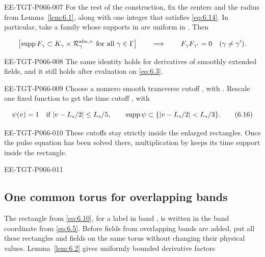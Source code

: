 \begin{EESegment}{EE-TGT-P066-007}
For the rest of the construction, fix the centers  and the radius  from Lemma~\ref{lem:6.1}, along with one integer  that satisfies \eqref{eq:6.14}. In particular, take a family  whose supports in  are uniform in . Then
\end{EESegment}
\[
 \bigl[\operatorname{supp} F_\gamma\subset K_\gamma\times\mathcal R_\gamma^{\mathrm{abs},+}
 \text{ for all }\gamma\in\Gamma\bigr]
 \qquad\Longrightarrow\qquad
 F_\gamma F_{\gamma'}=0
 \quad(\gamma\ne\gamma').
\]
\begin{EESegment}{EE-TGT-P066-008}
The same identity holds for derivatives of smoothly extended fields, and it still holds after evaluation on \eqref{eq:6.3}.
\end{EESegment}

\begin{EESegment}{EE-TGT-P066-009}
Choose a nonzero smooth transverse cutoff , with . Rescale one fixed function to get the time cutoff , with
\end{EESegment}
\begin{equation}
 \psi(v)=1\quad\text{if }|v-L_s/2|\le L_s/5,
 \qquad
 \operatorname{supp}\psi\subset\{|v-L_s/2|<L_s/3\}.
 \tag{6.16}\label{eq:6.16}
\end{equation}
\begin{EESegment}{EE-TGT-P066-010}
These cutoffs stay strictly inside the enlarged rectangles. Once the pulse equation has been solved there, multiplication by  keeps its time support inside the rectangle.
\end{EESegment}

\begin{EESegment}{EE-TGT-P066-011}
\subsection{One common torus for overlapping bands}\label{sec:6.3}

The rectangle  from \eqref{eq:6.10}, for a label in band , is written in the band coordinate  from \eqref{eq:6.5}. Before fields from overlapping bands are added, put all these rectangles and fields on the same torus  without changing their physical values. Lemma~\ref{lem:6.2} gives uniformly bounded derivative factors
\end{EESegment}
